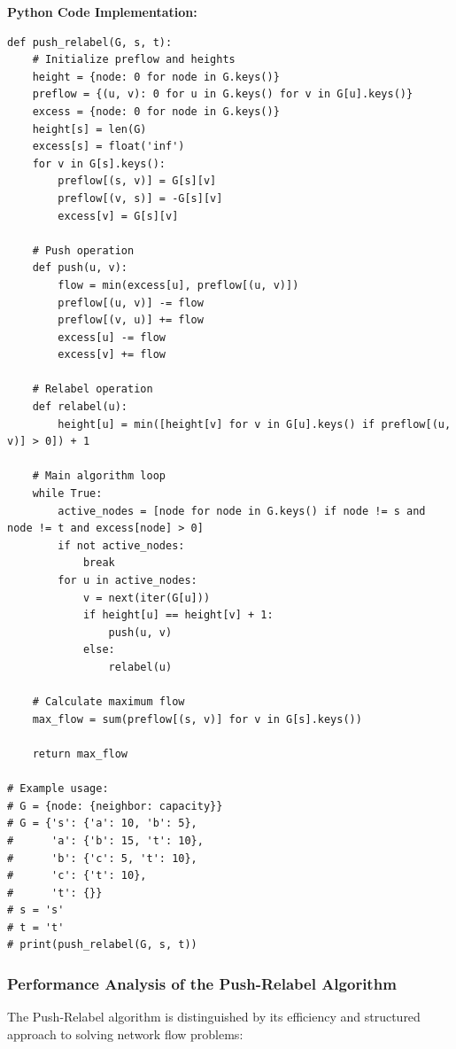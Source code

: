 \documentclass[12pt]{book} %
\begin{document}
\FloatBarrier
\textbf{Python Code Implementation:}
\FloatBarrier
\begin{lstlisting}
def push_relabel(G, s, t):
    # Initialize preflow and heights
    height = {node: 0 for node in G.keys()}
    preflow = {(u, v): 0 for u in G.keys() for v in G[u].keys()}
    excess = {node: 0 for node in G.keys()}
    height[s] = len(G)
    excess[s] = float('inf')
    for v in G[s].keys():
        preflow[(s, v)] = G[s][v]
        preflow[(v, s)] = -G[s][v]
        excess[v] = G[s][v]
    
    # Push operation
    def push(u, v):
        flow = min(excess[u], preflow[(u, v)])
        preflow[(u, v)] -= flow
        preflow[(v, u)] += flow
        excess[u] -= flow
        excess[v] += flow
    
    # Relabel operation
    def relabel(u):
        height[u] = min([height[v] for v in G[u].keys() if preflow[(u, v)] > 0]) + 1
    
    # Main algorithm loop
    while True:
        active_nodes = [node for node in G.keys() if node != s and node != t and excess[node] > 0]
        if not active_nodes:
            break
        for u in active_nodes:
            v = next(iter(G[u]))
            if height[u] == height[v] + 1:
                push(u, v)
            else:
                relabel(u)
    
    # Calculate maximum flow
    max_flow = sum(preflow[(s, v)] for v in G[s].keys())
    
    return max_flow

# Example usage:
# G = {node: {neighbor: capacity}}
# G = {'s': {'a': 10, 'b': 5},
#      'a': {'b': 15, 't': 10},
#      'b': {'c': 5, 't': 10},
#      'c': {'t': 10},
#      't': {}}
# s = 's'
# t = 't'
# print(push_relabel(G, s, t))
\end{lstlisting}

\subsubsection{Performance Analysis of the Push-Relabel Algorithm}

The Push-Relabel algorithm is distinguished by its efficiency and structured approach to solving network flow problems:
\end{document}
